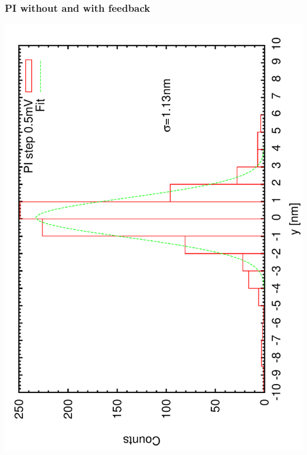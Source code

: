 \documentclass[a4paper,11pt]{book}
\begin{document}
\subsubsection{PI without and with feedback}
\includegraphics[angle=-90,scale=0.20]{imagestep01.pdf}
\end{document}
